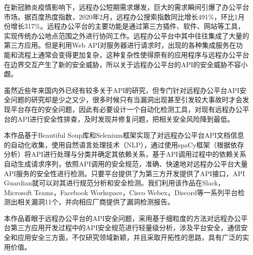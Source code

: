 \documentclass{cumcmthesis}
\begin{document}
 \maketitle
 
 \newpage
 \thispagestyle{empty}
 \tableofcontents
 \newpage
 
\begin{cnabstract}
在新冠肺炎疫情影响下，远程办公短期需求爆发，巨大的需求瞬间引爆了办公平台市场。据百度热度指数，2020年2月，远程办公搜索指数同比增长491\%，环比1月份增长317\%。远程办公平台的主要功能是通过第三方插件、软件、网站等工具，实现传统办公地点范围之外进行协同工作。远程办公平台中其中往往集成了大量的第三方应用。但是利用Web API对服务器进行请求时，出现的各种集成服务在功能和流程上通常会变得更加复杂，这种复杂性使得原有的应用程序与远程办公平台在边界交互产生了新的安全威胁，所以关于远程办公平台的API的安全威胁不容小觑。

虽然近些年来国内外已经有较多关于API的研究，但专门针对远程办公平台API安全问题的研究却是少之又少，很多时候只有当漏洞出现甚至引发较大事故时才会发现平台存在的安全问题，因此有必要设计一个自动化检测工具，对现有远程办公平台的API进行安全性排查，及时发现并修复问题，把相关安全风险降到最低。

本作品基于Beautiful Soup库和Selenium框架实现了对远程办公平台API文档信息的自动化收集，使用自然语言处理技术（NLP），通过使用spaCy框架（根据依存分析）将API进行处理与分类并确定其依赖关系，基于API调用过程中的依赖关系自动生成请求序列，依照API调用的安全规范，准确、快速地对远程办公平台大量API服务的安全性进行检测。只要平台提供了为第三方开发提供了API接口，API Guardian就可以对其进行规范分析和安全检测。我们利用该作品在Slack，Microsoft Teams，Facebook Workspace，Cisco Webex，Discord等一系列平台检测出相关漏洞11个，并向相应厂商提供了漏洞检测报告。

本作品着眼于远程办公平台的API安全问题，采用基于细粒度的方法对远程办公平台第三方应用开发过程中的API安全规范进行轻量级分析，涉及平台安全，通信安全和应用安全三方面，不仅研究领域新颖，并且采取开拓性的思路，具有广泛的实用价值。
	
\end{cnabstract}
\end{document}
